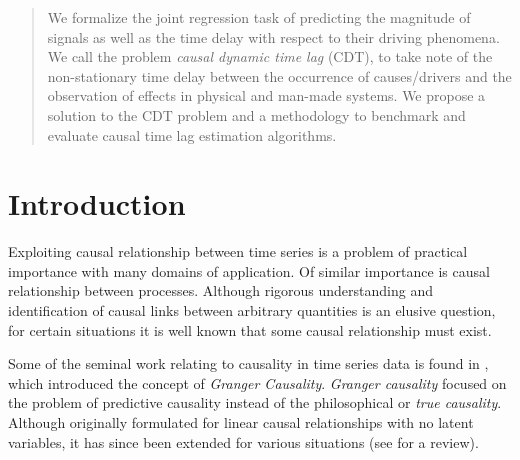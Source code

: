 \documentclass[twoside]{article}
\begin{document}
%

%


\begin{abstract}
  We formalize the joint regression task of predicting the magnitude of signals as well as the time delay with respect to their driving phenomena. We call the problem \emph{causal dynamic time lag} (CDT), to take note of the non-stationary time delay between the occurrence of causes/drivers and the observation of effects in physical and man-made systems. We propose a solution to the CDT problem and a methodology to benchmark and evaluate causal time lag estimation algorithms.
\end{abstract}

\section{Introduction}
Exploiting causal relationship between time series is a problem of practical importance with many domains of application. Of similar importance is causal relationship between processes. Although rigorous understanding and identification of causal links between arbitrary quantities is an elusive question, for certain situations it is well known that some causal relationship must exist. 

Some of the seminal work relating to causality in time series data is found in \cite{Granger}, which introduced the concept of \emph{Granger Causality}. \emph{Granger causality} focused on the problem of predictive causality instead of the philosophical or \emph{true causality}. Although originally formulated for linear causal relationships with no latent variables, it has since been extended for various situations (see \cite{doi:10.1002/9781119945710.ch22} for a review).
\end{document}
